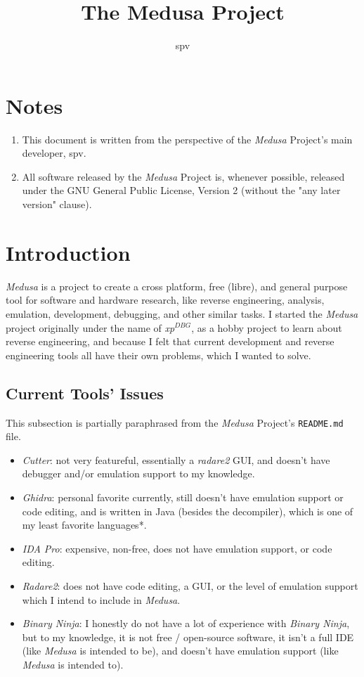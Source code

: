 \documentclass{article}
\title{The Medusa Project}
\author{spv}
\begin{document}
	\maketitle

	\section{Notes}
	\begin{enumerate}
		\item This document is written from the perspective of the
		\textit{Medusa} Project's main developer, spv.
		\item All software released by the \textit{Medusa} Project is, whenever
		possible, released under the GNU General Public License, Version 2
		(without the "any later version" clause).
	\end{enumerate}

	\section{Introduction}
	\textit{Medusa} is a project to create a cross platform, free (libre), and
	general purpose tool for software and hardware research, like reverse
	engineering, analysis, emulation, development, debugging, and other similar
	tasks. I started the \textit{Medusa} project originally under the name of
	\textit{xp$^{DBG}$}, as a hobby project to learn about reverse engineering,
	and because I felt that current development and reverse engineering tools
	all have their own problems, which I wanted to solve.

	\subsection{Current Tools' Issues}
	This subsection is partially paraphrased from the \textit{Medusa} Project's
	\texttt{README.md} file.

	\begin{itemize}
		\item \textit{Cutter}: not very featureful, essentially a
		\textit{radare2} GUI, and doesn't have debugger and/or emulation support
		to my knowledge.
		\item \textit{Ghidra}: personal favorite currently, still doesn't have
		emulation support or code editing, and is written in Java (besides the
		decompiler), which is one of my least favorite languages*.
		\item \textit{IDA Pro}: expensive, non-free, does not have emulation
		support, or code editing.
		\item \textit{Radare2}: does not have code editing, a GUI, or the level
		of emulation support which I intend to include in \textit{Medusa}.
		\item \textit{Binary Ninja}: I honestly do not have a lot of experience
		with \textit{Binary Ninja}, but to my knowledge, it is not free / 
		open-source software, it isn't a full IDE (like \textit{Medusa} is
		intended to be), and doesn't have emulation support (like
		\textit{Medusa} is intended to).
	\end{itemize}
\end{document}
